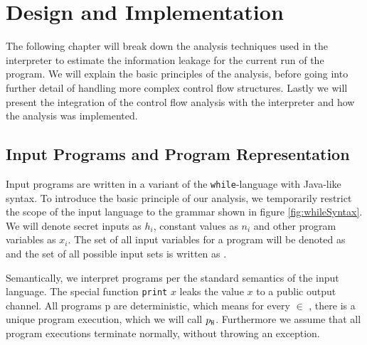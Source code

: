 \chapter{Design and Implementation}\label{sec:impl}

The following chapter will break down the analysis techniques used in the interpreter to estimate the information leakage for the current run of the program. We will explain the basic principles of the analysis, before going into further detail of handling more complex control flow structures. Lastly we will present the integration of the control flow analysis with the interpreter and how the analysis was implemented.


\section{Input Programs and Program Representation}

Input programs are written in a variant of the \texttt{while}-language with Java-like syntax. To introduce the basic principle of our analysis, we temporarily restrict the scope of the input language to the grammar shown in figure \ref{fig:whileSyntax}. We will denote secret inputs as $h_i$, constant values as $n_i$ and other program variables as $x_i$. The set of all input variables for a program will be denoted as \In and the set of all possible input sets is written as \allIn.

Semantically, we interpret programs per the standard semantics of the input language. The special function \texttt{print} $x$ leaks the value $x$ to a public output channel. All programs p are deterministic, which means for every \In $\in$ \allIn, there is a unique program execution, which we will call $p_{\mathtt{H}}$. Furthermore we assume that all program executions terminate normally, without throwing an exception.

